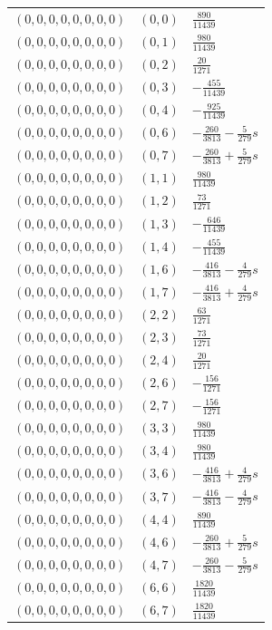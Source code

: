 \begin{longtable}{@{}lll@{}}
$(0,0,0,0,0,0,0,0)$ & $(0,0)$ & $\frac{890}{11439}$\\
$(0,0,0,0,0,0,0,0)$ & $(0,1)$ & $\frac{980}{11439}$\\
$(0,0,0,0,0,0,0,0)$ & $(0,2)$ & $\frac{20}{1271}$\\
$(0,0,0,0,0,0,0,0)$ & $(0,3)$ & $-\frac{455}{11439}$\\
$(0,0,0,0,0,0,0,0)$ & $(0,4)$ & $-\frac{925}{11439}$\\
$(0,0,0,0,0,0,0,0)$ & $(0,6)$ & $-\frac{260}{3813}-\frac{5}{279}s$\\
$(0,0,0,0,0,0,0,0)$ & $(0,7)$ & $-\frac{260}{3813}+\frac{5}{279}s$\\
$(0,0,0,0,0,0,0,0)$ & $(1,1)$ & $\frac{980}{11439}$\\
$(0,0,0,0,0,0,0,0)$ & $(1,2)$ & $\frac{73}{1271}$\\
$(0,0,0,0,0,0,0,0)$ & $(1,3)$ & $-\frac{646}{11439}$\\
$(0,0,0,0,0,0,0,0)$ & $(1,4)$ & $-\frac{455}{11439}$\\
$(0,0,0,0,0,0,0,0)$ & $(1,6)$ & $-\frac{416}{3813}-\frac{4}{279}s$\\
$(0,0,0,0,0,0,0,0)$ & $(1,7)$ & $-\frac{416}{3813}+\frac{4}{279}s$\\
$(0,0,0,0,0,0,0,0)$ & $(2,2)$ & $\frac{63}{1271}$\\
$(0,0,0,0,0,0,0,0)$ & $(2,3)$ & $\frac{73}{1271}$\\
$(0,0,0,0,0,0,0,0)$ & $(2,4)$ & $\frac{20}{1271}$\\
$(0,0,0,0,0,0,0,0)$ & $(2,6)$ & $-\frac{156}{1271}$\\
$(0,0,0,0,0,0,0,0)$ & $(2,7)$ & $-\frac{156}{1271}$\\
$(0,0,0,0,0,0,0,0)$ & $(3,3)$ & $\frac{980}{11439}$\\
$(0,0,0,0,0,0,0,0)$ & $(3,4)$ & $\frac{980}{11439}$\\
$(0,0,0,0,0,0,0,0)$ & $(3,6)$ & $-\frac{416}{3813}+\frac{4}{279}s$\\
$(0,0,0,0,0,0,0,0)$ & $(3,7)$ & $-\frac{416}{3813}-\frac{4}{279}s$\\
$(0,0,0,0,0,0,0,0)$ & $(4,4)$ & $\frac{890}{11439}$\\
$(0,0,0,0,0,0,0,0)$ & $(4,6)$ & $-\frac{260}{3813}+\frac{5}{279}s$\\
$(0,0,0,0,0,0,0,0)$ & $(4,7)$ & $-\frac{260}{3813}-\frac{5}{279}s$\\
$(0,0,0,0,0,0,0,0)$ & $(6,6)$ & $\frac{1820}{11439}$\\
$(0,0,0,0,0,0,0,0)$ & $(6,7)$ & $\frac{1820}{11439}$\\

\end{longtable}
